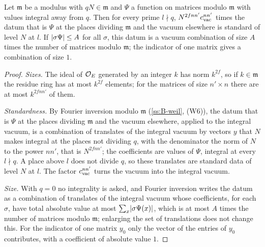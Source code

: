 \begin{proposition}\label{prop:mod-datum}
Let $\mathfrak m$ be a modulus with $qN\in\mathfrak m$ and $\Psi$ a function on matrices modulo $\mathfrak m$ with values integral away from
$q$. Then for every prime $l\nmid q$, $N^{2fnn'}c_{\rm vac}^{nn'}$ times the datum that is $\Psi$ at the places dividing $\mathfrak m$ and the vacuum
elsewhere is standard of level $N$ at $l$. If $\lvert \sigma\Psi\rvert\le A$ for all $\sigma$, this datum is a vacuum combination of size $A$ times
the number of matrices modulo $\mathfrak m$; the indicator of one matrix gives a combination of size $1$.
\end{proposition}

\begin{proof}
\emph{Sizes.} The ideal of $\mathcal{O}_E$ generated by an integer $k$ has norm $k^{2f}$, so if $k\in\mathfrak m$ the residue ring has at most $k^{2f}$ elements; for the matrices of size $n'\times n$ there are at most $k^{2fnn'}$ of them.

\emph{Standardness.} By Fourier inversion modulo $\mathfrak m$ (\cref{ss:B-weil}, (W6)), the datum that is $\Psi$ at the places dividing $\mathfrak m$ and the vacuum elsewhere, applied to the integral vacuum, is a combination of translates of the integral vacuum by vectors $y$ that $N$ makes integral at the places not dividing $q$, with
the denominator the norm of $N$ to the power $nn'$, that is $N^{2fnn'}$; the coefficients are values of $\Psi$, integral at every $l\nmid q$. A place above $l$ does not divide $q$, so these translates are standard data of level $N$ at $l$. The factor $c_{\rm vac}^{nn'}$ turns the vacuum into the integral vacuum.

\emph{Size.} With $q=0$ no integrality is asked, and Fourier inversion writes the datum as a combination of translates of the integral vacuum whose coefficients, for each $\sigma$, have total absolute value at most $\sum_x\lvert \sigma\Psi(x)\rvert$, which is at most $A$ times the number of matrices modulo $\mathfrak m$; enlarging the set of
translations does not change this. For the indicator of one matrix $y_0$ only the vector of the entries of $y_0$ contributes, with a coefficient of absolute value $1$.
\end{proof}
